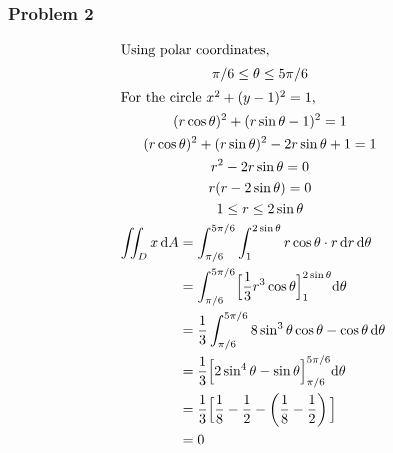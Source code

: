\documentclass[12pt]{article}
\newcommand*\diff{\mathop{}\!\mathrm{d}}
\begin{document}
\subsubsection*{Problem 2}
\begin{gather*}
	\intertext{Using polar coordinates,}
	\pi/6 \le \theta \le 5\pi/6 \\
	\intertext{For the circle $x^2 + (y-1)^2 = 1$,}
	(r\cos\theta)^2 + (r\sin\theta - 1)^2 = 1 \\
	(r\cos\theta)^2 + (r\sin\theta)^2 -2r\sin\theta + 1 = 1 \\
	r^2 -2r\sin\theta = 0 \\
	r(r -2\sin\theta) = 0 \\
	1 \le r \le 2\sin\theta \\
	\begin{align*}
		\iint_D x \diff A &= \int_{\pi/6}^{5\pi/6} \int_1^{2\sin\theta} 
			r\cos\theta \cdot r
		\diff r \diff \theta &\\
		&= \int_{\pi/6}^{5\pi/6}
			\Bigl[ \frac{1}{3} r^3 \cos\theta \Bigl]_1^{2\sin\theta} 
		\diff \theta \\
		&= \frac{1}{3} \int_{\pi/6}^{5\pi/6}
			 8 \sin^3\theta \cos\theta - \cos\theta
		\diff \theta \\
		&= \frac{1}{3} \Bigl[
			 2 \sin^4\theta - \sin\theta
		\Bigl]_{\pi/6}^{5\pi/6} \diff \theta \\
		&= \frac{1}{3} \Bigl[
			 \frac{1}{8} - \frac{1}{2} - \left(\frac{1}{8} - \frac{1}{2}\right)
		\Bigl] \\
		&= 0
	\end{align*}
\end{gather*}
\filbreak
\end{document}
